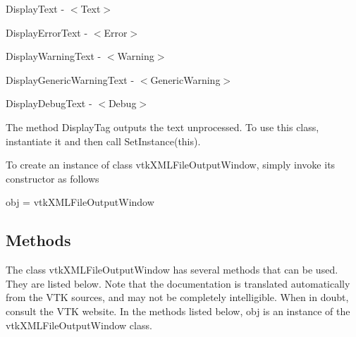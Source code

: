 Display\-Text -\/ $<$\-Text$>$

Display\-Error\-Text -\/ $<$\-Error$>$

Display\-Warning\-Text -\/ $<$\-Warning$>$

Display\-Generic\-Warning\-Text -\/ $<$\-Generic\-Warning$>$

Display\-Debug\-Text -\/ $<$\-Debug$>$

The method Display\-Tag outputs the text unprocessed. To use this class, instantiate it and then call Set\-Instance(this).

To create an instance of class vtk\-X\-M\-L\-File\-Output\-Window, simply invoke its constructor as follows \begin{DoxyVerb}  obj = vtkXMLFileOutputWindow
\end{DoxyVerb}
 \hypertarget{vtkwidgets_vtkxyplotwidget_Methods}{}\subsection{Methods}\label{vtkwidgets_vtkxyplotwidget_Methods}
The class vtk\-X\-M\-L\-File\-Output\-Window has several methods that can be used. They are listed below. Note that the documentation is translated automatically from the V\-T\-K sources, and may not be completely intelligible. When in doubt, consult the V\-T\-K website. In the methods listed below, {\ttfamily obj} is an instance of the vtk\-X\-M\-L\-File\-Output\-Window class. 

